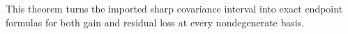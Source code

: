 This theorem turns the imported sharp covariance interval into exact endpoint formulas for both gain and residual loss at every nondegenerate basis.